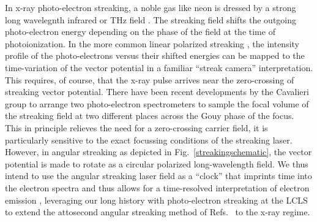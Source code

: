 In x-ray photo-electron streaking, a noble gas like neon is dressed by a strong long wavelegnth infrared or THz field \cite{Review2017}.
The streaking field shifts the outgoing photo-electron energy depending on the phase of the field at the time of photoionization.
In the more common linear polarized streaking \cite{Adrian2012streaking,Helml2014,Juranic2014,Schulz2015,Hoffmann2018}, the intensity profile of the photo-electrons versus their shifted energies can be mapped to the time-variation of the vector potential in a familiar ``streak camera'' interpretation.
This requires, of course, that the x-ray pulse arrives near the zero-crossing of streaking vector potential.
There have been recent developments by the Cavalieri group to arrange two photo-electron spectrometers to sample the focal volume of the streaking field at two different places across the Gouy phase of the focus.
This in principle relieves the need for a zero-crossing carrier field, it is particularly sensitive to the exact focussing conditions of the streaking laser.
However, in angular streaking as depicted in Fig.~\ref{streakingschematic}, the vector potential is made to rotate as a circular polarized long-wavelength field.
We thus intend to use the angular streaking laser field as a ``clock'' that imprints time into the electron spectra and thus allows for a time-resolved interpretation of electron emission \cite{KellerNonadiabatic2013}, leveraging our long history with photo-electron streaking at the LCLS \cite{Duesterer11,Meyer12,Adrian2012streaking,Helml2014,Hoffmann2018} to extend the attosecond angular streaking method of Refs.~\cite{CorkumAngularStreaking,KellerAngularStreaking} to the x-ray regime.

